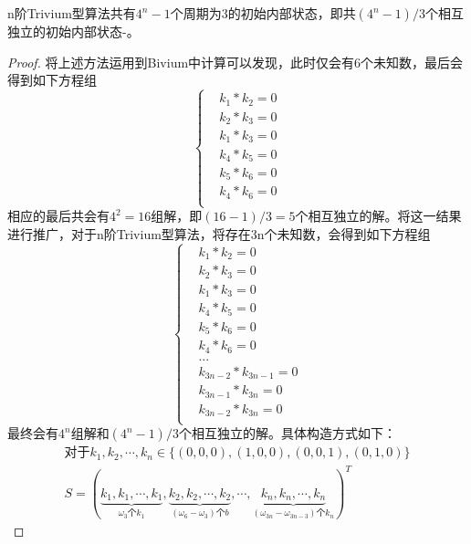 \begin{thm}
	n阶Trivium型算法共有$4^{n}-1$个周期为3的初始内部状态，即共$(4^{n}-1)/3$个相互独立的初始内部状态-。
	\begin{proof}
		将上述方法运用到Bivium中计算可以发现，此时仅会有6个未知数，最后会得到如下方程组
		\begin{equation}
			\left\{
			\begin{aligned}
				&k_{1}*k_{2}=0\\
				&k_{2}*k_{3}=0\\
				&k_{1}*k_{3}=0\\
				&k_{4}*k_{5}=0\\
				&k_{5}*k_{6}=0\\
				&k_{4}*k_{6}=0\\
			\end{aligned}
			\right.
		\end{equation}
		相应的最后共会有$4^{2}=16$组解，即$(16-1)/3=5$个相互独立的解。将这一结果进行推广，对于n阶Trivium型算法，将存在3n个未知数，会得到如下方程组
		\begin{equation}
			\left\{
			\begin{aligned}
			&k_{1}*k_{2}=0\\
			&k_{2}*k_{3}=0\\
			&k_{1}*k_{3}=0\\
			&k_{4}*k_{5}=0\\
			&k_{5}*k_{6}=0\\
			&k_{4}*k_{6}=0\\
			&...\\
			&k_{3n-2}*k_{3n-1}=0\\
			&k_{3n-1}*k_{3n}=0\\
			&k_{3n-2}*k_{3n}=0\\
			\end{aligned}
			\right.
		\end{equation}
		最终会有$4^{n}$组解和$(4^{n}-1)/3$个相互独立的解。具体构造方式如下：
		\begin{align}
		\label{eq:n_trivium_cycle_3_param_res}
		\text{对于}k_{1}, k_{2}, \cdots, k_{n} \in \{(0, 0, 0), (1, 0, 0), (0, 0, 1), (0, 1, 0)\}\\
		S = (\underbrace{k_{1},k_{1},\cdots,k_{1}}_{\omega_{3}\text{个}k_{1}},\underbrace{k_{2},k_{2},\cdots,k_{2}}_{(\omega_{6}-\omega_{3})\text{个}b}, \cdots,\underbrace{k_{n},k_{n},\cdots,k_{n}}_{(\omega_{3n}-\omega_{3n-3})\text{个}k_{n}})^{T}
		\end{align}
	\end{proof}
\end{thm}

